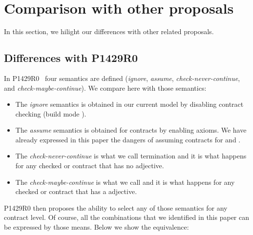 \section{Comparison with other proposals}
\label{sec:compare}

In this section, we hilight our differences with other related proposals.

\subsection{Differences with P1429R0}

In P1429R0~\cite{p1429r0} four semantics are defined (\emph{ignore}, 
\emph{assume}, \emph{check-never-continue}, and 
\emph{check-maybe-continue}). We compare here with those semantics:

\begin{itemize}
  \item The \emph{ignore} semantics is obtained in our current model
        by disabling contract checking (build mode ).
  \item The \emph{assume} semantics is obtained for 
        contracts by enabling axioms. We have already expressed in this
        paper the dangers of assuming contracts for 
        and .
  \item The \emph{check-never-continue} is what we call termination and
        it is what happens for any checked  or 
        contract that has no  adjective.
  \item The \emph{check-maybe-continue} is what we call  and
        it is what happens for any checked  or 
        contract that has a  adjective.
\end{itemize}

P1429R0 then proposes the ability to select any of those semantics for any
contract level. Of course, all the combinations that we identified in this
paper can be expressed by those means. Below we show the equivalence:

